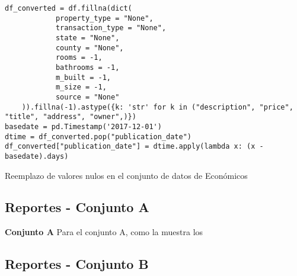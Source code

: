 \begin{listing}[H]
    \begin{verbatim}
df_converted = df.fillna(dict(
            property_type = "None",
            transaction_type = "None",
            state = "None",
            county = "None",
            rooms = -1,
            bathrooms = -1,
            m_built = -1,
            m_size = -1,
            source = "None"
    )).fillna(-1).astype({k: 'str' for k in ("description", "price", "title", "address", "owner",)})
basedate = pd.Timestamp('2017-12-01')
dtime = df_converted.pop("publication_date")
df_converted["publication_date"] = dtime.apply(lambda x: (x - basedate).days)
    \end{verbatim}
\caption{Reemplazo de valores nulos en el conjunto de datos de Económicos}
\label{codigo-replace-nan}
\end{listing}

\newpage
\subsection{Reportes - Conjunto A}
\textbf{Conjunto A} 
\label{ds-conjunto-a}
Para el conjunto A, como la  muestra los 



%




%


%

%

\newpage
\subsection{Reportes - Conjunto B}
\label{ds-conjunto-b}















